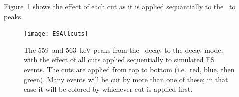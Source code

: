 \documentclass[/main.tex]{subfiles}
\begin{document}
Figure~\ref{fig:escuteffects} shows the effect of each cut as it is applied sequantially to the \tnbb\ to  peaks.
\begin{figure}[htb]
  \centering
  \texttt{[image: ESAllcuts]}
  \caption[Simulated \tnbb to  peaks with cuts applied]{\label{fig:escuteffects}
    The 559~and 563~keV peaks from the \tnbb\ decay to the  decay mode, with the effect of all cuts applied sequentially to simulated ES events. The cuts are applied from top to bottom (i.e.~red, blue, then green). Many events will be cut by more than one of these; in that case it will be colored by whichever cut is applied first. 
  }
\end{figure}

\onlyinsubfile{
  
  
}
\end{document}
